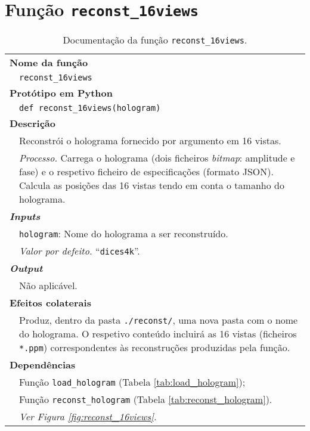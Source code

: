 
\newpage
\section{Função \texttt{reconst\_16views}}
\label{sec::doc-codigo:reconst_16views}

\begin{table}[!hp]
    \centering
    \caption{Documentação da função \texttt{reconst\_16views}.}
    \label{tab:reconst_16views}
    \begin{tabular}{p{1cm} p{11.5cm}}
        \hline
        \multicolumn{2}{l}{\bfseries\small Nome da função}\\
         & \verb|reconst_16views|\\
        \hline
        \multicolumn{2}{l}{\bfseries\small Protótipo em Python}\\
         & \texttt{def reconst_16views(hologram)} \\
        \hline\multicolumn{2}{l}{\bfseries\small Descrição}\\
         & Reconstrói o holograma fornecido por argumento em 16 vistas. \\
         & \textit{Processo.} Carrega o holograma (dois ficheiros \textit{bitmap}: amplitude e fase) e o respetivo ficheiro de especificações (formato \ac{JSON}). Calcula as posições das 16 vistas tendo em conta o tamanho do holograma.\\
        \hline\multicolumn{2}{l}{\bfseries\small \textit{Inputs}}\\
         & \verb|hologram|: Nome do holograma a ser reconstruído.\\
         & \hspace{1cm} \textit{Valor por defeito.} ``\verb|dices4k|''.\\
        \hline\multicolumn{2}{l}{\bfseries\small \textit{Output}}\\
         & Não aplicável.\\
        \hline\multicolumn{2}{l}{\bfseries\small Efeitos colaterais}\\
         & Produz, dentro da pasta \verb|./reconst/|, uma nova pasta com o nome do holograma. O respetivo conteúdo incluirá as 16 vistas (ficheiros \verb|*.ppm|) correspondentes às reconstruções produzidas pela função.\\
        \hline\multicolumn{2}{l}{\bfseries\small Dependências}\\
         & Função \verb|load_hologram| (Tabela \ref{tab:load_hologram}); \\
         & Função \verb|reconst_hologram| (Tabela \ref{tab:reconst_hologram}). \\
         & \textit{Ver Figura \ref{fig:reconst_16views}.} \\
        \hline
    \end{tabular}
\end{table}


